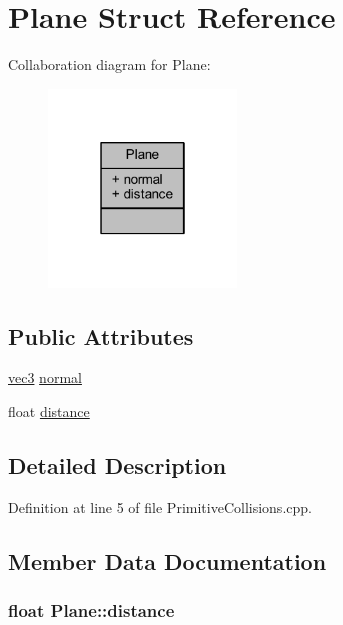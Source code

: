 \hypertarget{struct_plane}{}\section{Plane Struct Reference}
\label{struct_plane}


Collaboration diagram for Plane\+:\nopagebreak
\begin{figure}[H]
\begin{center}
\leavevmode
\includegraphics[width=142pt]{struct_plane__coll__graph}
\end{center}
\end{figure}
\subsection*{Public Attributes}
\begin{DoxyCompactItemize}
\item 
\hyperlink{_types_8h_a3d0ce73e3199de81565fb01632415288}{vec3} \hyperlink{struct_plane_ac3a6d80b28df1dd0ef7867663227c937}{normal}
\item 
float \hyperlink{struct_plane_a6ad7fdbb1461aa0527eb1f6745e10962}{distance}
\end{DoxyCompactItemize}


\subsection{Detailed Description}


Definition at line 5 of file Primitive\+Collisions.\+cpp.



\subsection{Member Data Documentation}
\subsubsection[{\texorpdfstring{distance}{distance}}]{\setlength{\rightskip}{0pt plus 5cm}float Plane\+::distance}\hypertarget{struct_plane_a6ad7fdbb1461aa0527eb1f6745e10962}{}\label{struct_plane_a6ad7fdbb1461aa0527eb1f6745e10962}


